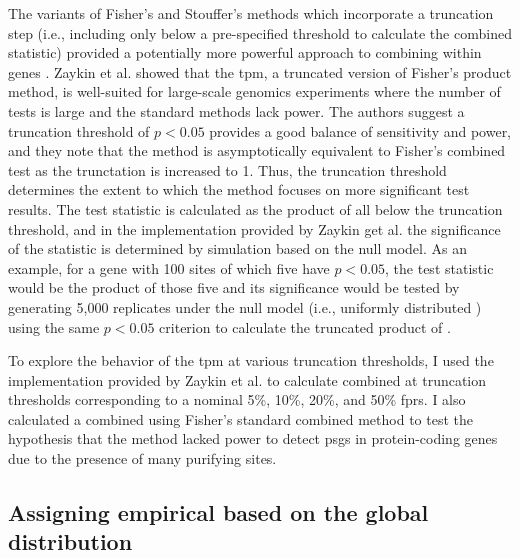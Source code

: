 The variants of Fisher's and Stouffer's methods which incorporate a
truncation step (i.e., including only \pvs below a pre-specified
threshold to calculate the combined statistic) provided a potentially
more powerful approach to combining \sw \pvs within genes
\citep{Darlington2000,Zaykin2002,Zaykin2007}. Zaykin et
al. \citeyearpar{Zaykin2002,Zaykin2007} showed that the \ac{tpm}, a
truncated version of Fisher's product method, is well-suited for
large-scale genomics experiments where the number of tests is large
and the standard methods lack power. The authors suggest a truncation
threshold of $p<0.05$ provides a good balance of sensitivity and
power, and they note that the method is asymptotically equivalent to
Fisher's combined test as the \pv trunctation is increased to 1. Thus,
the truncation threshold determines the extent to which the method
focuses on more significant test results. The test statistic is
calculated as the product of all \pvs below the truncation threshold,
and in the implementation provided by Zaykin get
al. \citeyearpar{Zaykin2002} the significance of the statistic is
determined by simulation based on the null model. As an example, for a
gene with 100 sites of which five have $p<0.05$, the test statistic
would be the product of those five \pvs and its significance would be
tested by generating 5,000 replicates under the null model (i.e.,
uniformly distributed \pvs) using the same $p<0.05$ criterion to
calculate the truncated product of \pvs.

To explore the behavior of the \ac{tpm} at various \pv truncation
thresholds, I used the implementation provided by Zaykin et
al. \citeyearpar{Zaykin2002} to calculate combined \pvs at
truncation thresholds corresponding to a nominal 5\%, 10\%, 20\%, and
50\% \sw \acp{fpr}. I also calculated a combined \pv using
Fisher's standard combined method to test the hypothesis that the
method lacked power to detect \acp{psg} in protein-coding genes due to
the presence of many purifying sites.

\subsection{Assigning empirical \pvs based on the global \sw distribution}

